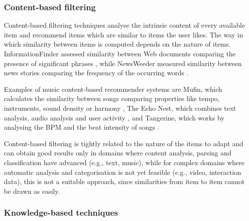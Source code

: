 
\subsubsection{Content-based filtering} %
\label{ssub:content_based_filtering}

Content-based filtering techniques analyse the intrinsic content of every available item and recommend items which are similar to items the user likes. 
The way in which similarity between items is computed depends on the nature of items.
InformationFinder assessed similarity between Web documents comparing the presence of significant phrases \cite{Krulwich96}, while NewsWeeder measured similarity between news stories comparing the frequency of the occurring words \cite{Lang95}.


Examples of music content-based recommender systems are Mufin, %
which calculates the similarity between songs comparing properties like tempo, instruments, sound density or harmony \cite{Mufin08}, The Echo Nest, %
which combines text analysis, audio analysis and user activity \cite{EchoNest09}, and Tangerine, %
which works by analysing the BPM and the beat intensity of songs \cite{Tangerine09}.

Content-based filtering is tightly related to the nature of the items to adapt and can obtain good results only in domains where content analysis, parsing and classification have advanced (e.g., text, music), while for complex domains where automatic analysis and categorisation is not yet feasible (e.g., video, interaction data), this is not a suitable approach, since similarities from item to item cannot be drawn as easily.


\subsubsection{Knowledge-based techniques} %
\label{ssub:hybrid_filtering}

